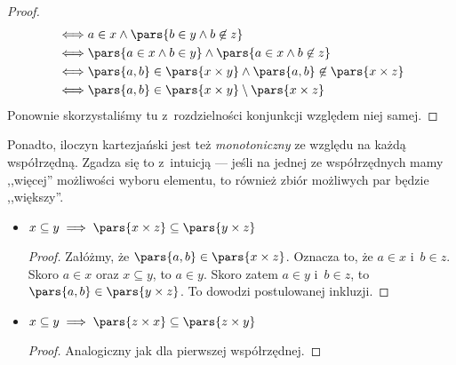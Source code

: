 \begin{itemize}
\begin{proof}
\begin{equation*}
\begin{split}
				      \iff & a \in x \land \pars{b \in y \land b \not\in z}                                \\
				      \iff & \pars{a \in x \land b \in y} \land \pars{a \in x \land b \not \in z}          \\
				      \iff & \pars{a, b} \in \pars{x \times y} \land \pars{a, b} \not\in \pars{x \times z} \\
				      \iff & \pars{a, b} \in \pars{x \times y} \setminus \pars{x \times z}
			      \end{split}
		      \end{equation*}
		      Ponownie skorzystaliśmy tu z~rozdzielności konjunkcji względem niej samej.
	      \end{proof}
\end{itemize}
Ponadto, iloczyn kartezjański jest też \emph{monotoniczny} ze względu na każdą współrzędną. Zgadza się to z~intuicją --- jeśli na jednej ze współrzędnych mamy ,,więcej'' możliwości wyboru elementu, to również zbiór możliwych par będzie ,,większy''.
\begin{itemize}
	\item \(x \subseteq y \implies \pars{x \times z} \subseteq \pars{y \times z}\)
	      \begin{proof}
		      Załóżmy, że \(\pars{a, b} \in \pars{x \times z}\). Oznacza to, że \(a \in x\) i~\(b \in z\). Skoro \(a \in x\) oraz \(x \subseteq y\), to \(a \in y\). Skoro zatem \(a \in y\) i~\(b \in z\), to \(\pars{a, b} \in \pars{y \times z}\). To dowodzi postulowanej inkluzji.
	      \end{proof}
	\item \(x \subseteq y \implies \pars{z \times x} \subseteq \pars{z \times y}\)
	      \begin{proof}
		      Analogiczny jak dla pierwszej współrzędnej.
	      \end{proof}
\end{itemize}
